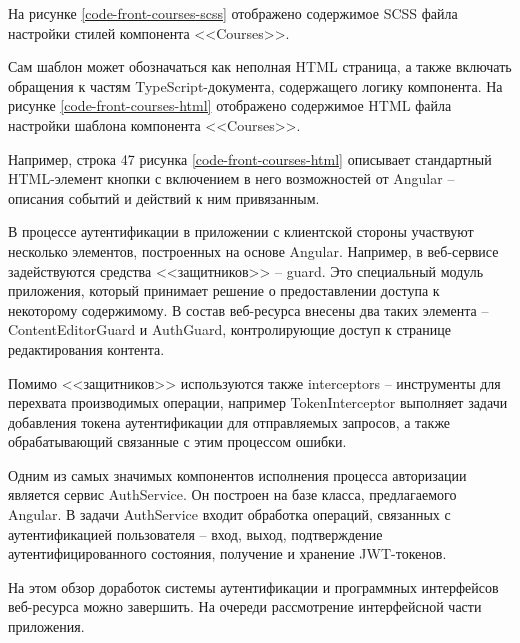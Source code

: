 На рисунке \ref{code-front-courses-scss} отображено содержимое SCSS файла настройки стилей компонента <<Courses>>.


Сам шаблон может обозначаться как неполная HTML страница, а также включать обращения к частям TypeScript-документа, содержащего логику компонента.
На рисунке \ref{code-front-courses-html} отображено содержимое HTML файла настройки шаблона компонента <<Courses>>.


Например, строка 47 рисунка \ref{code-front-courses-html} описывает стандартный HTML-элемент кнопки с включением в него возможностей от Angular -- описания событий и действий к ним привязанным.

В процессе аутентификации в приложении с клиентской стороны участвуют несколько элементов, построенных на основе Angular.
Например, в веб-сервисе задействуются средства <<защитников>> -- guard.
Это специальный модуль приложения, который принимает решение о предоставлении доступа к некоторому содержимому.
В состав веб-ресурса внесены два таких элемента -- ContentEditorGuard и AuthGuard, контролирующие доступ к странице редактирования контента.

Помимо <<защитников>> используются также interceptors -- инструменты для перехвата производимых операции, например TokenInterceptor выполняет задачи добавления токена аутентификации для отправляемых запросов, а также обрабатывающий связанные с этим процессом ошибки.

Одним из самых значимых компонентов исполнения процесса авторизации является сервис AuthService.
Он построен на базе класса, предлагаемого Angular.
В задачи AuthService входит обработка операций, связанных с аутентификацией пользователя -- вход, выход, подтверждение аутентифицированного состояния, получение и хранение JWT-токенов.

На этом обзор доработок системы аутентификации и программных интерфейсов веб-ресурса можно завершить.
На очереди рассмотрение интерфейсной части приложения.

\clearpage
